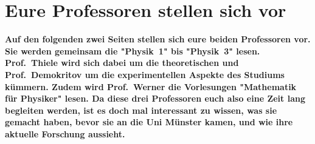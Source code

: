 \section{Eure Professoren stellen sich vor}
\vspace{-0.5cm}
\textbf{Auf den folgenden zwei Seiten stellen sich eure beiden Professoren vor. Sie werden gemeinsam die "Physik~1" bis "Physik~3" lesen. Prof.\ Thiele wird sich dabei um die theoretischen und Prof.\ Demokritov um die experimentellen Aspekte des Studiums kümmern. Zudem wird Prof.\ Werner die Vorlesungen "Mathematik für Physiker" lesen. Da diese drei Professoren euch also eine Zeit lang begleiten werden, ist es doch mal interessant zu wissen, was sie gemacht haben, bevor sie an die Uni Münster kamen, und wie ihre aktuelle Forschung aussieht.}

